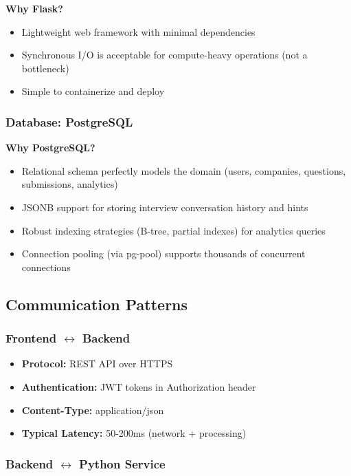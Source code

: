 \documentclass[12pt,a4paper,oneside]{article}
\begin{document}
\textbf{Why Flask?}
\begin{itemize}
    \item Lightweight web framework with minimal dependencies
    \item Synchronous I/O is acceptable for compute-heavy operations (not a bottleneck)
    \item Simple to containerize and deploy
\end{itemize}

\subsubsection{Database: PostgreSQL}

\textbf{Why PostgreSQL?}
\begin{itemize}
    \item Relational schema perfectly models the domain (users, companies, questions, submissions, analytics)
    \item JSONB support for storing interview conversation history and hints
    \item Robust indexing strategies (B-tree, partial indexes) for analytics queries
    \item Connection pooling (via pg-pool) supports thousands of concurrent connections
\end{itemize}

\subsection{Communication Patterns}

\subsubsection{Frontend $\leftrightarrow$ Backend}

\begin{itemize}
    \item \textbf{Protocol:} REST API over HTTPS
    \item \textbf{Authentication:} JWT tokens in Authorization header
    \item \textbf{Content-Type:} application/json
    \item \textbf{Typical Latency:} 50-200ms (network + processing)
\end{itemize}

\subsubsection{Backend $\leftrightarrow$ Python Service}
\end{document}
